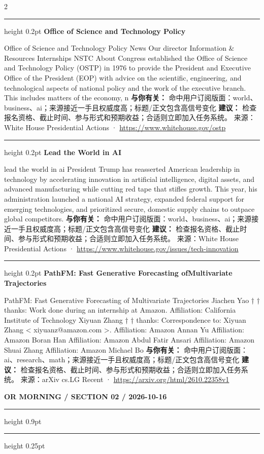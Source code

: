 \documentclass[10.5pt]{ctexart}
\begin{document}
\begin{multicols}{2}
\vspace{2mm}
\hrule height 0.2pt
\vspace{2mm}
{\large\bfseries Office of Science and Technology Policy}\par
Office of Science and Technology Policy News Our director Information \& Resources Internships NSTC About Congress established the Office of Science and Technology Policy (OSTP) in 1976 to provide the President and Executive Office of the President (EOP) with advice on the scientific, engineering, and technological aspects of national policy and the work of the executive branch. This includes matters of the economy, n
\textbf{与你有关：} 命中用户订阅版面：world、business、ai；来源接近一手且权威度高；标题/正文包含高信号变化
\textbf{建议：} 检查报名资格、截止时间、参与形式和预期收益；合适则立即加入任务系统。
{\footnotesize\color{ormuted} 来源：White House Presidential Actions · \url{https://www.whitehouse.gov/ostp}}
\vspace{2mm}
\hrule height 0.2pt
\vspace{2mm}
{\large\bfseries Lead the World in AI}\par
lead the world in ai President Trump has reasserted American leadership in technology by accelerating innovation in artificial intelligence, digital assets, and advanced manufacturing while cutting red tape that stifles growth. This year, his administration launched a national AI strategy, expanded federal support for emerging technologies, and prioritized secure, domestic supply chains to outpace global competitors.
\textbf{与你有关：} 命中用户订阅版面：world、business、ai；来源接近一手且权威度高；标题/正文包含高信号变化
\textbf{建议：} 检查报名资格、截止时间、参与形式和预期收益；合适则立即加入任务系统。
{\footnotesize\color{ormuted} 来源：White House Presidential Actions · \url{https://www.whitehouse.gov/issues/tech-innovation}}
\vspace{2mm}
\hrule height 0.2pt
\vspace{2mm}
{\large\bfseries PathFM: Fast Generative Forecasting ofMultivariate Trajectories}\par
PathFM: Fast Generative Forecasting of Multivariate Trajectories Jiachen Yao † † thanks: Work done during an internship at Amazon. Affiliation: California Institute of Technology Xiyuan Zhang † † thanks: Correspondence to: Xiyuan Zhang < xiyuanz@amazon.com >. Affiliation: Amazon Annan Yu Affiliation: Amazon Boran Han Affiliation: Amazon Abdul Fatir Ansari Affiliation: Amazon Shuai Zhang Affiliation: Amazon Michael Bo
\textbf{与你有关：} 命中用户订阅版面：ai、research、math；来源接近一手且权威度高；标题/正文包含高信号变化
\textbf{建议：} 检查报名资格、截止时间、参与形式和预期收益；合适则立即加入任务系统。
{\footnotesize\color{ormuted} 来源：arXiv cs.LG Recent · \url{https://arxiv.org/html/2610.22358v1}}
\end{multicols}
\newpage
{\small\bfseries OR MORNING / SECTION 02 / 2026-10-16}
\vspace{2mm}
\hrule height 0.9pt
\vspace{1.5mm}
\hrule height 0.25pt
\vspace{4mm}
\end{document}
